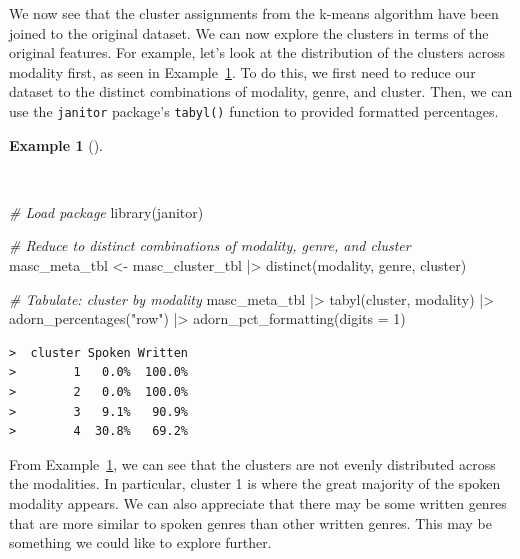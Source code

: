 \documentclass[
  letterpaper,
  DIV=11,
  numbers=noendperiod]{scrreport}
\newenvironment{Shaded}{\begin{snugshade}}{\end{snugshade}}
\newcommand{\AttributeTok}[1]{\textcolor[rgb]{0.00,0.00,0.00}{#1}}
\newcommand{\CommentTok}[1]{\textcolor[rgb]{0.00,0.00,0.00}{\textit{#1}}}
\newcommand{\DecValTok}[1]{\textcolor[rgb]{0.00,0.00,0.00}{#1}}
\newcommand{\FunctionTok}[1]{\textcolor[rgb]{0.00,0.00,0.00}{#1}}
\newcommand{\NormalTok}[1]{\textcolor[rgb]{0.00,0.00,0.00}{#1}}
\newcommand{\OtherTok}[1]{\textcolor[rgb]{0.00,0.00,0.00}{#1}}
\newcommand{\SpecialCharTok}[1]{\textcolor[rgb]{0.00,0.00,0.00}{#1}}
\newcommand{\StringTok}[1]{\textcolor[rgb]{0.00,0.00,0.00}{#1}}
\theoremstyle{definition}
\newtheorem{example}{Example}[chapter]
\theoremstyle{remark}
\begin{document}
We now see that the cluster assignments from the k-means algorithm have
been joined to the original dataset. We can now explore the clusters in
terms of the original features. For example, let's look at the
distribution of the clusters across modality first, as seen in
Example~\ref{exm-eda-masc-pos-kmeans-modality}. To do this, we first
need to reduce our dataset to the distinct combinations of modality,
genre, and cluster. Then, we can use the \texttt{janitor} package's
\texttt{tabyl()} function to provided formatted percentages.

\begin{example}[]\protect\hypertarget{exm-eda-masc-pos-kmeans-modality}{}\label{exm-eda-masc-pos-kmeans-modality}

~

\begin{Shaded}
\begin{Highlighting}[]
\CommentTok{\# Load package}
\FunctionTok{library}\NormalTok{(janitor)}

\CommentTok{\# Reduce to distinct combinations of modality, genre, and cluster}
\NormalTok{masc\_meta\_tbl }\OtherTok{\textless{}{-}} 
\NormalTok{  masc\_cluster\_tbl }\SpecialCharTok{|\textgreater{}} 
  \FunctionTok{distinct}\NormalTok{(modality, genre, cluster)}

\CommentTok{\# Tabulate: cluster by modality}
\NormalTok{masc\_meta\_tbl }\SpecialCharTok{|\textgreater{}}
  \FunctionTok{tabyl}\NormalTok{(cluster, modality) }\SpecialCharTok{|\textgreater{}} 
  \FunctionTok{adorn\_percentages}\NormalTok{(}\StringTok{"row"}\NormalTok{) }\SpecialCharTok{|\textgreater{}} 
  \FunctionTok{adorn\_pct\_formatting}\NormalTok{(}\AttributeTok{digits =} \DecValTok{1}\NormalTok{)}
\end{Highlighting}
\end{Shaded}

\begin{verbatim}
>  cluster Spoken Written
>        1   0.0%  100.0%
>        2   0.0%  100.0%
>        3   9.1%   90.9%
>        4  30.8%   69.2%
\end{verbatim}

\end{example}

From Example~\ref{exm-eda-masc-pos-kmeans-modality}, we can see that the
clusters are not evenly distributed across the modalities. In
particular, cluster 1 is where the great majority of the spoken modality
appears. We can also appreciate that there may be some written genres
that are more similar to spoken genres than other written genres. This
may be something we could like to explore further.
\end{document}
